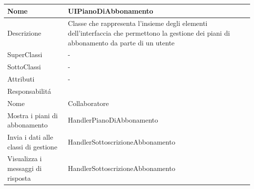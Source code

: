 \begin{center}
    \begin{longtable}{ |p{3cm}|p{3cm}|p{3cm}|p{3cm}| }
        \hline
        Nome & \multicolumn{3}{|p{9cm}|}{UIPianoDiAbbonamento} \\\hline
        Descrizione & \multicolumn{3}{|p{9cm}|}{Classe che rappresenta l'insieme degli elementi dell'interfaccia che permettono la gestione dei piani di abbonamento da parte di un utente} \\\hline
        SuperClassi & \multicolumn{3}{|p{9cm}|}{-} \\\hline
        SottoClassi & \multicolumn{3}{|p{9cm}|}{-} \\\hline
        Attributi & \multicolumn{3}{|p{9cm}|}{-} \\\hline
        \multicolumn{4}{|p{12cm}|}{Responsabilit\'a} \\\hline
        \multicolumn{2}{|p{5cm}|}{Nome} & \multicolumn{2}{|p{7cm}|}{Collaboratore} \\\hline
        \multicolumn{2}{|p{5cm}|}{Mostra i piani di abbonamento} & \multicolumn{2}{|p{7cm}|}{HandlerPianoDiAbbonamento} \\\hline
        \multicolumn{2}{|p{5cm}|}{Invia i dati alle classi di gestione} & \multicolumn{2}{|p{7cm}|}{HandlerSottoscrizioneAbbonamento} \\\hline
        \multicolumn{2}{|p{5cm}|}{Visualizza i messaggi di risposta} & \multicolumn{2}{|p{7cm}|}{HandlerSottoscrizioneAbbonamento} \\\hline
    \end{longtable}
\end{center}

